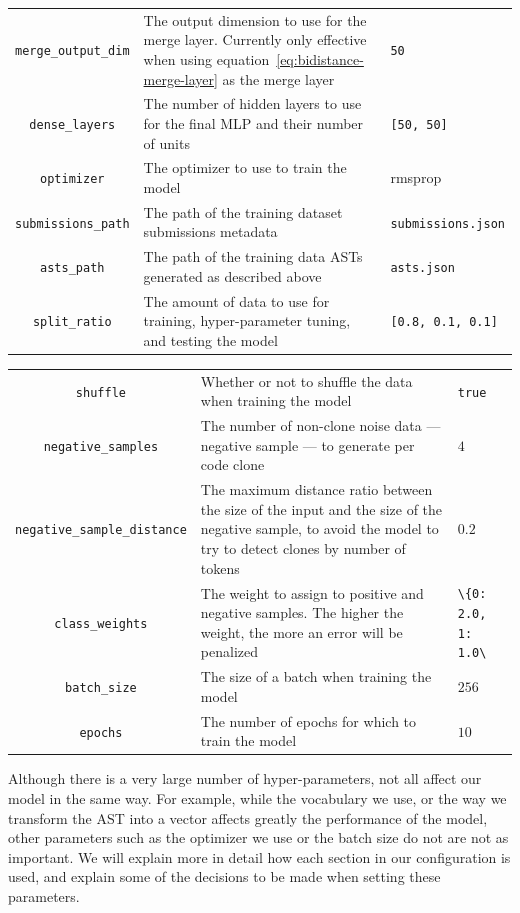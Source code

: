 \begin{table}
\begin{center}
\begin{tabularx}{\linewidth}{c X l}
      \lstinline{merge_output_dim} & The output dimension to use for the
      merge layer. Currently only effective when using
      equation~\ref{eq:bidistance-merge-layer} as the merge layer & \lstinline{50}\\
      \lstinline{dense_layers} & The number of hidden layers to use for the
      final MLP and their number of units & \lstinline{[50, 50]}\\
      \lstinline{optimizer} & The optimizer to use to train the model & rmsprop\\
      \lstinline{submissions_path} & The path of the training dataset
      submissions metadata & \lstinline{submissions.json}\\
      \lstinline{asts_path} & The path of the training data ASTs generated
      as described above & \lstinline{asts.json}\\
      \lstinline{split_ratio} & The amount of data to use for training,
      hyper-parameter tuning, and testing the model & \lstinline{[0.8, 0.1, 0.1]}\\
    \end{tabularx}
  \end{center}
\end{table}
\begin{table}
  \begin{center}
    \begin{tabularx}{\linewidth}{c X l}
      \lstinline{shuffle} & Whether or not to shuffle the data when training
      the model & \lstinline{true}\\
      \lstinline{negative_samples} & The number of non-clone noise data ---
      negative sample --- to generate per code clone & $4$\\
      \lstinline{negative_sample_distance} & The maximum distance ratio
      between the size of the input and the size of the negative sample, to avoid
      the model to try to detect clones by number of tokens & $0.2$\\
      \lstinline{class_weights} & The weight to assign to positive and
      negative samples. The higher the weight, the more an error will be
      penalized & \lstinline{\{0: 2.0, 1: 1.0\}}\\
      \lstinline{batch_size} & The size of a batch when training the model & $256$\\
      \lstinline{epochs} & The number of epochs for which to train the model & $10$\\
      \bottomrule
    \end{tabularx}
  \end{center}
\end{table}
%
Although there is a very large number of hyper-parameters, not all affect our
model in the same way. For example, while the vocabulary we use, or the way we
transform the AST into a vector affects greatly the performance of the model,
other parameters such as the optimizer we use or the batch size do not are not
as important. We will explain more in detail how each section in our
configuration is used, and explain some of the decisions to be made when setting
these parameters.

